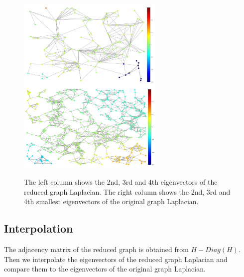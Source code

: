 \documentclass[a4paper]{article}
\begin{document}
\begin{figure}[H]
\includegraphics[width = 7cm]{plot_eigenvectors/reduced_eigenvec_3}
\includegraphics[width = 7cm]{plot_eigenvectors/original_eigenvec_3}

\caption{The left column shows the 2nd, 3rd and 4th eigenvectors of the reduced graph Laplacian. The right column shows the 2nd, 3rd and 4th smallest eigenvectors of the original graph Laplacian.}

\end{figure}

\subsection{Interpolation}

The adjacency matrix of the reduced graph is obtained from $H-Diag(H)$. Then we interpolate the eigenvectors of the reduced graph Laplacian and compare them to the eigenvectors of the original graph Laplacian.
\end{document}
